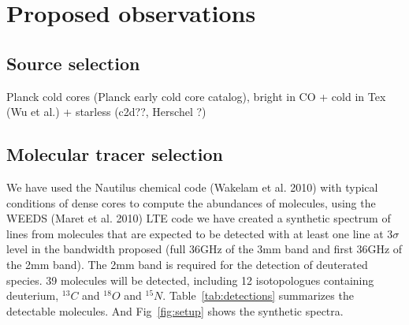 \section{Proposed observations}
\subsection{Source selection}
  Planck cold cores (Planck early cold core catalog), bright in CO + cold in Tex (Wu et al.) + starless (c2d??, Herschel ?)
\subsection{Molecular tracer selection}
  We have used the Nautilus chemical code (Wakelam et al. 2010) with typical conditions of dense cores to compute the abundances of molecules, using the WEEDS (Maret et al. 2010) LTE code we have created a synthetic spectrum of lines from molecules that are expected to be detected with at least one line at 3$\sigma$ level in the bandwidth proposed (full 36GHz of the 3mm band and first 36GHz of the 2mm band). The 2mm band is required for the detection of deuterated species. 39 molecules will be detected, including 12 isotopologues containing deuterium, $^{13}C$ and $^{18}O$ and $^{15}N$. Table~\ref{tab:detections} summarizes the detectable molecules. And Fig~\ref{fig:setup} shows the synthetic spectra.
  

  
  
  
  
  
  
  
  
  